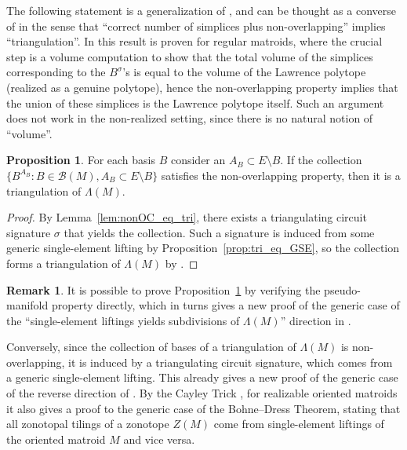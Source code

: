 \documentclass[12pt]{amsart}
\numberwithin{equation}{section}
\theoremstyle{definition}
\newtheorem{remark}[theorem]{Remark}
\newtheorem{proposition}[theorem]{Proposition}
\newcommand{\Bcal}{{\mathcal B}}
\newcommand{\Chiho}[1]{\todo[size=\tiny,inline,color=green!30]{#1 \\ \hfill --- Ch.}}
\begin{document}
The following statement is a generalization of \cite[Theorem~1.28]{Ding_GB2}, and can be thought as a converse of \cite[Proposition~4.12]{Santos_book} in the sense that ``correct number of simplices plus non-overlapping'' implies ``triangulation''. In
\cite{Ding_GB2} this result is proven for regular matroids, where the crucial step is a volume computation to show that the total volume of the simplices corresponding to the $B^\sigma$'s is equal to the volume of the Lawrence polytope (realized as a genuine polytope), hence the non-overlapping property implies that the union of these simplices is the Lawrence polytope itself. Such an argument does not work in the non-realized setting, since there is no natural notion of ``volume''.

\begin{proposition} \label{prop:tri_eq_tri}
For each basis $B$ consider an $A_B \subset E\setminus B$. If the collection
$\{B^{A_B}:B\in\Bcal(M), A_B\subset E\setminus B\}$ satisfies the non-overlapping property, then
it is a triangulation of $\Lambda(M)$.
\end{proposition}

\begin{proof}
By Lemma~\ref{lem:nonOC_eq_tri}, there exists a triangulating circuit signature $\sigma$ that yields the collection.
Such a signature is induced from some generic single-element lifting by Proposition~\ref{prop:tri_eq_GSE}, so the collection forms a triangulation of $\Lambda(M)$ by \cite[Theorem~4.14]{Santos_book}.
\end{proof}

\begin{remark}
It is possible to prove Proposition~\ref{prop:tri_eq_tri} by verifying the pseudo-manifold property directly, which in turns gives a new proof of the generic case of the ``single-element liftings yields subdivisions of $\Lambda(M)$'' direction in \cite[Theorem~4.14(i)]{Santos_book}.

Conversely, since the collection of bases of a triangulation of $\Lambda(M)$ is non-overlapping, it is induced by a triangulating circuit signature, which comes from a generic single-element lifting.
This already gives a new proof of the generic case of the reverse direction of \cite[Theorem~4.14(i)]{Santos_book}.
%
By the Cayley Trick \cite{HRS-Cayley}, for realizable oriented matroids it also gives a proof to the generic case of the Bohne--Dress Theorem, stating that all zonotopal tilings of a zonotope $Z(M)$ come from single-element liftings of the oriented matroid $M$ and vice versa.
\end{remark}
\end{document}
